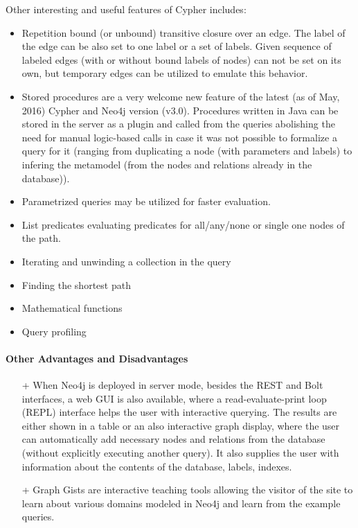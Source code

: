 Other interesting and useful features of Cypher includes:
\begin{itemize}
  \item Repetition bound (or unbound) transitive closure over an edge. The label of the edge can be also set to one label or a set of labels. Given sequence of labeled edges (with or without bound labels of nodes) can not be set on its own, but temporary edges can be utilized to emulate this behavior.
  \item Stored procedures are a very welcome new feature of the latest (as of May, 2016) Cypher and Neo4j version (v3.0). Procedures written in Java can be stored in the server as a plugin and called from the queries abolishing the need for manual logic-based calls in case it was not possible to formalize a query for it (ranging from duplicating a node (with parameters and labels) to infering the metamodel (from the nodes and relations already in the database)).
  \item Parametrized queries may be utilized for faster evaluation.
  \item List predicates evaluating predicates for all/any/none or single one nodes of the path.
  \item Iterating and unwinding a collection in the query
  \item Finding the shortest path
  \item Mathematical functions
  \item Query profiling
\end{itemize}


\paragraph{Other Advantages and Disadvantages}
\begin{itemize}
  \item[+] When Neo4j is deployed in server mode, besides the REST and Bolt interfaces, a web GUI is also available, where a read-evaluate-print loop (REPL) interface helps the user with interactive querying. The results are either shown in a table or an also interactive graph display, where the user can automatically add necessary nodes and relations from the database (without explicitly executing another query). It also supplies the user with information about the contents of the database, labels, indexes.
  \item[+] Graph Gists are interactive teaching tools allowing the visitor of the site to learn about various domains modeled in Neo4j and learn from the example queries.
\end{itemize}

